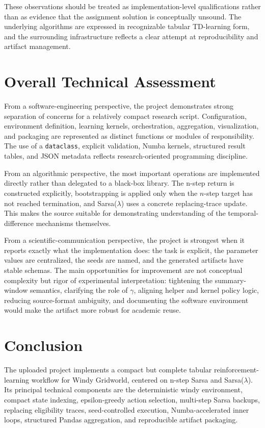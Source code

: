\documentclass[11pt,a4paper]{article}
\begin{document}
These observations should be treated as implementation-level qualifications rather than as evidence that the assignment solution is conceptually unsound. The underlying algorithms are expressed in recognizable tabular TD-learning form, and the surrounding infrastructure reflects a clear attempt at reproducibility and artifact management.

\section{Overall Technical Assessment}
From a software-engineering perspective, the project demonstrates strong separation of concerns for a relatively compact research script. Configuration, environment definition, learning kernels, orchestration, aggregation, visualization, and packaging are represented as distinct functions or modules of responsibility. The use of a \texttt{dataclass}, explicit validation, Numba kernels, structured result tables, and JSON metadata reflects research-oriented programming discipline.

From an algorithmic perspective, the most important operations are implemented directly rather than delegated to a black-box library. The n-step return is constructed explicitly, bootstrapping is applied only when the $n$-step target has not reached termination, and Sarsa($\lambda$) uses a concrete replacing-trace update. This makes the source suitable for demonstrating understanding of the temporal-difference mechanisms themselves.

From a scientific-communication perspective, the project is strongest when it reports exactly what the implementation does: the task is explicit, the parameter values are centralized, the seeds are named, and the generated artifacts have stable schemas. The main opportunities for improvement are not conceptual complexity but rigor of experimental interpretation: tightening the summary-window semantics, clarifying the role of $\gamma$, aligning helper and kernel policy logic, reducing source-format ambiguity, and documenting the software environment would make the artifact more robust for academic reuse.

\section{Conclusion}
The uploaded project implements a compact but complete tabular reinforcement-learning workflow for Windy Gridworld, centered on n-step Sarsa and Sarsa($\lambda$). Its principal technical components are the deterministic windy environment, compact state indexing, epsilon-greedy action selection, multi-step Sarsa backups, replacing eligibility traces, seed-controlled execution, Numba-accelerated inner loops, structured Pandas aggregation, and reproducible artifact packaging.
\end{document}
